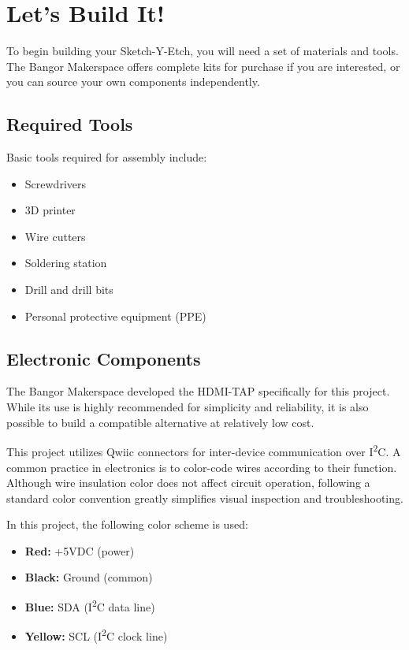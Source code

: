 \documentclass[]{article}
\begin{document}
\section*{Let's Build It!}

To begin building your Sketch-Y-Etch, you will need a set of materials and tools.  
The Bangor Makerspace offers complete kits for purchase if you are interested, or you can source your own components independently.

\subsection*{Required Tools}

Basic tools required for assembly include:
\begin{itemize}
	\item Screwdrivers
	\item 3D printer
	\item Wire cutters
	\item Soldering station
	\item Drill and drill bits
	\item Personal protective equipment (PPE)
\end{itemize}

\subsection*{Electronic Components}

The Bangor Makerspace developed the HDMI-TAP specifically for this project. While its use is highly recommended for simplicity and reliability, it is also possible to build a compatible alternative at relatively low cost.

This project utilizes Qwiic connectors for inter-device communication over I\textsuperscript{2}C.  
A common practice in electronics is to color-code wires according to their function. Although wire insulation color does not affect circuit operation, following a standard color convention greatly simplifies visual inspection and troubleshooting.

In this project, the following color scheme is used:

\begin{itemize}
	\item \textbf{Red:} +5VDC (power)
	\item \textbf{Black:} Ground (common)
	\item \textbf{Blue:} SDA (I\textsuperscript{2}C data line)
	\item \textbf{Yellow:} SCL (I\textsuperscript{2}C clock line)
\end{itemize}
\end{document}
